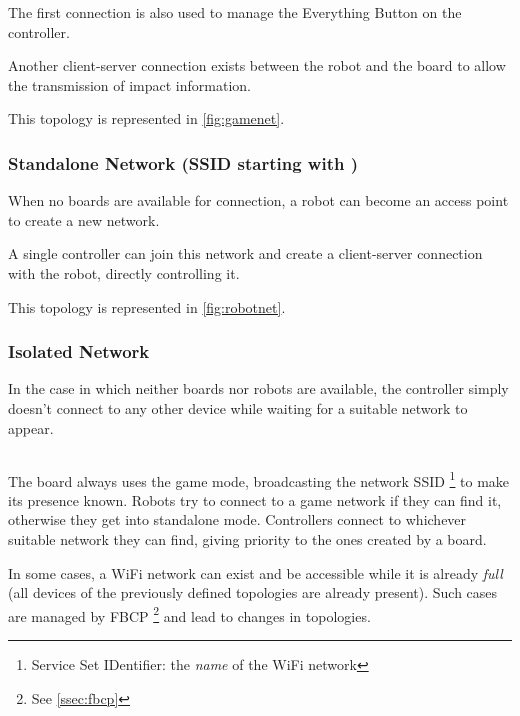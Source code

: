   The first connection is also used to manage the Everything Button
  on the controller.

  Another client-server connection exists between the robot and the
  board to allow the transmission of impact information.

  This topology is represented in \autoref{fig:gamenet}.

\subsubsection{Standalone Network (SSID starting with
  )}
  When no boards are available for connection, a robot can become an
  access point to create a new network.

  A single controller can join this network and create a
  client-server connection with the robot, directly controlling it.
  
  This topology is represented in \autoref{fig:robotnet}.

\subsubsection{Isolated Network}
  In the case in which neither boards nor robots are available, the
  controller simply doesn't connect to any other device while
  waiting for a suitable network to appear.

\subsection*{}
The board always uses the game mode, broadcasting the network SSID%
\footnote{Service Set IDentifier: the \textit{name} of the WiFi
network} to make its presence known. Robots try to connect to a game
network if they can find it, otherwise they get into standalone
mode. Controllers connect to whichever suitable network they can
find, giving priority to the ones created by a board.

In some cases, a WiFi network can exist and be accessible while it
is already \textit{full} (all devices of the previously defined
topologies are already present). Such cases are managed by FBCP%
\footnote{See \autoref{ssec:fbcp}} and lead to changes in topologies.

